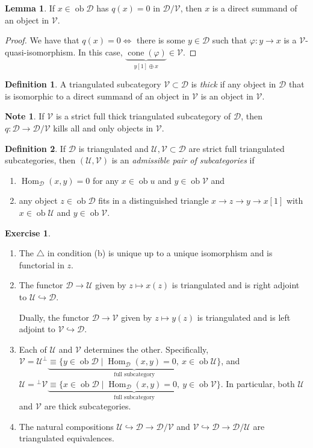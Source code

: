 \documentclass[10pt,letterpaper,cm]{nupset}
\theoremstyle{definition}
\newtheorem*{definition}{Definition}
\newtheorem{note}{Note}
\newtheorem{lemma}{Lemma}
\newtheorem{exercise}{Exercise}
\newcommand{\1}{\mathbf{1}}
\renewcommand{\d}{\mathscr{D}}
\renewcommand{\u}{\mathscr{U}}
\renewcommand{\v}{\mathscr{V}}
\newcommand{\0}{\vec 0}
\DeclareMathOperator{\ob}{ob}
\DeclareMathOperator{\Hom}{Hom}
\DeclareMathOperator{\cone}{cone}
\begin{document}
\begin{lemma}
If $x \in \ob{\d}$ has $q(x) = 0$ in $\d/\v$, then $x$ is a direct summand of an object in $\v$.
\end{lemma}
\begin{proof}
We have that $q(x) =0 \iff$ there is some $y\in \d$ such that $\varphi : y \to x$ is a $\v$-quasi-isomorphism. In this case, $\underbrace{\cone(\varphi)}_{y[1] \oplus x} \in \v$.
\end{proof}

\begin{definition}
A triangulated subcategory $\v \subset \d$ is \textit{thick} if any object in $\d$ that is isomorphic to a direct summand of an object in $\v$ is an object in $\v$. 
\end{definition}

\begin{note}
If $\v$ is a strict full thick triangulated subcategory	 of $\d$, then $q : \d \to \d/\v$ kills all and only objects in $\v$. 
\end{note}

\begin{definition}
If $\d$ is triangulated and $\u, \v \subset \d$ are strict full triangulated subcategories, then $(\u, \v)$ is an \textit{admissible pair of subcategories} if 
\begin{enumerate}[label=(\alph*)]
\item $\Hom_{\d}(x,y) =0$ for any $x \in \ob{u}$ and $y \in \ob{\v}$ and
\item any object $z \in \ob{\d}$ fits in a distinguished triangle $x \to z \to y \to x[1]$ with $x \in \ob{\u}$ and $y \in \ob{\v}$. 
\end{enumerate}
\end{definition}

\begin{exercise} $ $
\begin{enumerate}
\item The $\triangle$ in condition (b) is unique up to a unique isomorphism and is functorial in $z$.
\item The functor $\d \to \u$ given by $z \mapsto x(z)$ is triangulated and is right adjoint to $\u \hookrightarrow \d$. 

Dually, the functor $\d \to \v$ given by $z \mapsto y(z)$ is triangulated and is left adjoint to $\v \hookrightarrow \d$.
\item Each of $\u$ and $\v$ determines the other. Specifically, $\v = \u^{\perp} \underbrace{\equiv \{y \in \ob{\d} \mid \Hom_{\d}(x,y) = 0, \ x \in \ob{\u}\}}_{\text{full subcategory}}$, and $\u = {^{\perp}{\v}} \underbrace{\equiv \{x \in \ob{\d} \mid \Hom_{\d}(x,y) =0, \ y \in \ob{\v}\}}_{\text{full subcategory}}$. In particular, both $\u$ and $\v$ are thick subcategories. 
\item The natural compositions $\u \hookrightarrow \d \to \d/\v$ and $\v \hookrightarrow \d \to \d/\u$ are triangulated equivalences. 
\end{enumerate}
\end{exercise}
\end{document}

